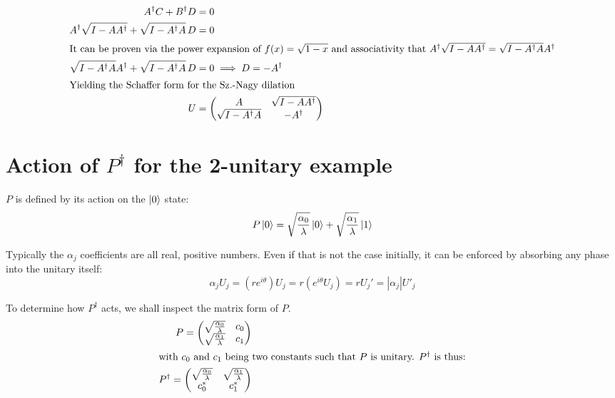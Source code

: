 \begin{align*}
    A^\dagger C + B^\dagger D &= 0 \\
    A^\dagger \sqrt{I - A A^\dagger} + \sqrt{I - A^\dagger A} \, D &= 0 \\
    \intertext{It can be proven via the power expansion of $f(x) = \sqrt{1-x}$ and associativity that $A^\dagger \sqrt{I - A A^\dagger} = \sqrt{I - A^\dagger A}A^\dagger$}
    \sqrt{I - A^\dagger A} A^\dagger + \sqrt{I - A^\dagger A} \, D &= 0 \implies D = -A^\dagger \\
    \intertext{Yielding the Schaffer form for the Sz.-Nagy dilation}
    U &= \begin{pmatrix} A & \sqrt{I - A A^\dagger} \\ \sqrt{I - A^\dagger A} & -A^\dagger \end{pmatrix}
\end{align*}

\section{Action of $P^\dagger$ for the 2-unitary example}
\label{app:inverse_prepare}

$P$ is defined by its action on the $\ket{0}$ state:
\begin{equation*}
    P\ket{0} = \sqrt{\frac{\alpha_0}{\lambda}}\ket{0} + \sqrt{\frac{\alpha_1}{\lambda}}\ket{1}
\end{equation*}

Typically the $\alpha_j$ coefficients are all real, positive numbers. Even if that is not the case initially, it can be enforced by absorbing any phase into the unitary itself:
\begin{equation*}
    \alpha_j U_j = (re^{i\theta})U_j = r(e^{i\theta}U_j) = rU_j' = |\alpha_j|U'_j
\end{equation*}

To determine how $P^\dagger$ acts, we shall inspect the matrix form of $P$. 
\begin{align*}
    P = \begin{pmatrix} \sqrt{\frac{\alpha_0}{\lambda}} & c_0 \\ \sqrt{\frac{\alpha_1}{\lambda}} & c_1 \end{pmatrix} \\
    \intertext{with $c_0$ and $c_1$ being two constants such that $P$ is unitary. $P^\dagger$ is thus:}
    P^\dagger = \begin{pmatrix} \sqrt{\frac{\alpha_0}{\lambda}} & \sqrt{\frac{\alpha_1}{\lambda}} \\ c_{0}^* & c_{1}^* \end{pmatrix}
\end{align*}


